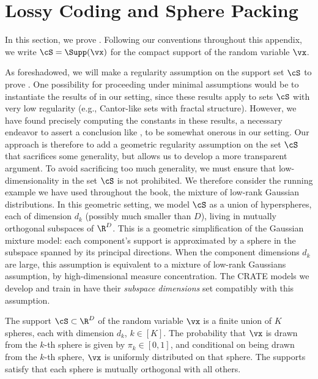 \documentclass[../../book-main.tex]{subfiles}
\begin{document}
\section{Lossy Coding and Sphere Packing}\label{app:rate-distortion-covering}

In this section, we prove .
Following our conventions throughout this appendix, we write $\cS = \Supp(\vx)$
for the compact support of the random variable $\vx$.

As foreshadowed, we will make a regularity assumption on the support set $\cS$
to prove . One possibility for
proceeding under minimal assumptions would be to instantiate the results of
\cite{Riegler2018-jh,Riegler2023-rr} in our setting, since these results apply
to sets $\cS$ with very low regularity (e.g., Cantor-like sets with fractal
structure). However, we have found precisely computing the constants in these
results, a necessary endeavor to assert a conclusion like
, to be somewhat onerous in our
setting.
Our approach is therefore to add a geometric regularity assumption on
the set $\cS$ that sacrifices some generality, but allows us to develop
a more transparent argument. To avoid sacrificing too much generality, we must
ensure that low-dimensionality in the set $\cS$ is not prohibited.
We therefore consider the running example we have used throughout the book, the
mixture of low-rank Gaussian distributions. In this geometric setting, we
model $\cS$ as a union of hyperspheres, each of dimension $d_k$ (possibly
much smaller than $D$), living in mutually orthogonal subspaces of $\R^D$.
This is a geometric simplification of the Gaussian mixture model: each
component's support is approximated by a sphere in the subspace spanned by its
principal directions. When the component dimensions $d_k$ are large, this
assumption is equivalent to a mixture of low-rank Gaussians assumption, by
high-dimensional measure concentration. The CRATE models we develop and train in
 have their \textit{subspace dimensions}
set compatibly with this assumption.

\begin{assumption}\label{assumption:union-of-spheres}
    The support $\cS \subset \R^D$ of the random variable $\vx$ is a finite
    union of $K$ spheres, each with dimension $d_k$, $k \in [K]$.
    The probability that $\vx$ is drawn from the $k$-th sphere is given by
    $\pi_k \in [0, 1]$, and conditional on being drawn from the $k$-th sphere,
    $\vx$ is uniformly distributed on that sphere.
    The supports satisfy that each sphere is mutually orthogonal with all
    others.
\end{assumption}
\end{document}
